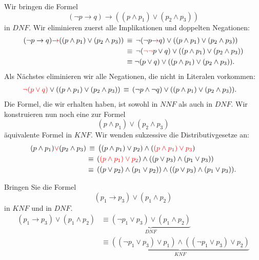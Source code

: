 \begin{example}
    Wir bringen die Formel
    \[
        (\neg p\to q)\to ((p\land p_1)\lor(p_2\land p_3))
    \]
    in $DNF$.
    \tcblower
    Wir eliminieren zuerst alle Implikationen und doppelten Negationen:
    \begin{align*}
        (\neg p\to q)\textcolor{red}{\to} ((p\land p_1)\lor(p_2\land p_3))\,&\equiv\, \neg(\neg p\textcolor{red}{\to} q)\lor ((p\land p_1)\lor(p_2\land p_3))\\
        &\equiv\, \neg(\textcolor{red}{\neg\neg} p \lor q)\lor ((p\land p_1)\lor(p_2\land p_3))\\
        &\equiv \neg(p \lor q)\lor ((p\land p_1)\lor(p_2\land p_3)).
    \end{align*}
    Als Nächstes eliminieren wir alle Negationen, die nicht in Literalen vorkommen:
    \begin{align*}
        \textcolor{red}{\neg(p \lor q)}\lor ((p\land p_1)\lor(p_2\land p_3))\,&\equiv\,(\neg p\land\neg q)\lor ((p\land p_1)\lor(p_2\land p_3)).
    \end{align*}
    Die Formel, die wir erhalten haben, ist sowohl in $NNF$ als auch in $DNF$. Wir konstruieren nun noch eine zur Formel
    \[
        (p\land p_1)\lor(p_2\land p_3)
    \]
    äquivalente Formel in $KNF$. Wir wenden sukzessive die Distributivgesetze an:
    \begin{align*}
        (p\land p_1)\textcolor{red}{\lor}(p_2\land p_3)&\,\equiv\,\big( (p\land p_1)\lor p_2)\land (\textcolor{red}{(p\land p_1)\lor p_3})\\
        &\equiv\, (\textcolor{red}{(p\land p_1)\lor p_2})\land ((p\lor p_3)\land(p_1\lor p_3))\\
        &\equiv\, ((p\lor p_2)\land(p_1\lor p_2))\land ((p\lor p_3)\land(p_1\lor p_3)).
    \end{align*}
\end{example}

\begin{example}
    Bringen Sie die Formel
    \[
        (p_1\to p_3)\lor(p_1\land p_2)
    \]
    in $KNF$ und in $DNF$.
    \tcblower
    \begin{align*}
        (p_1\to p_3)\lor(p_1\land p_2)&\equiv \underbrace{(\neg p_1\lor p_3)\lor (p_1\land p_2)}_{DNF}\\
        &\equiv \underbrace{((\neg p_1\lor p_3)\lor p_1)\land ((\neg p_1\lor p_3)\lor p_2)}_{KNF}
    \end{align*}
\end{example}

